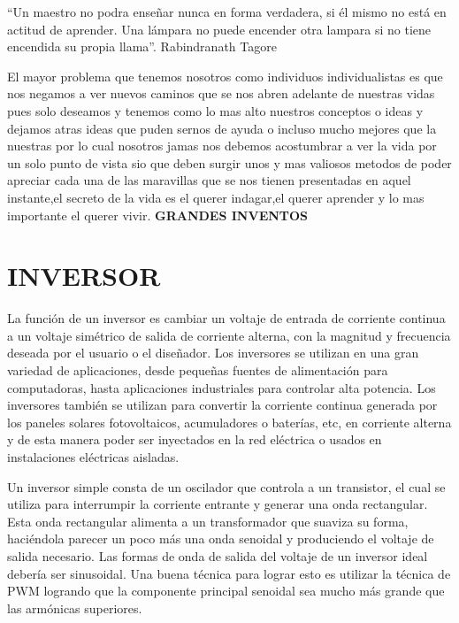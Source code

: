 \documentclass[12pt]{article}
\begin{document}
\vspace{15PT}
“Un maestro no podra enseñar nunca en forma verdadera, si él mismo no está en actitud de aprender. Una lámpara no puede encender otra lampara si no tiene encendida su propia llama”. Rabindranath Tagore

\vspace{15PT}
El mayor problema que tenemos nosotros como individuos individualistas es que nos negamos a ver nuevos caminos que se nos abren adelante de nuestras vidas pues solo deseamos y tenemos como lo mas alto nuestros conceptos o ideas y dejamos atras ideas que puden sernos de ayuda o incluso mucho mejores que la nuestras por lo cual nosotros jamas nos debemos acostumbrar a ver la vida por un solo punto de vista sio que deben surgir unos y mas valiosos metodos de poder apreciar cada una de las maravillas que se nos tienen presentadas en aquel instante,el secreto de la vida es el querer indagar,el querer aprender y lo mas importante el querer vivir.
\newpage
\bf{\sc\Huge GRANDES INVENTOS}
\section{INVERSOR}
\large
La función de un inversor es cambiar un voltaje de entrada de corriente continua a un voltaje simétrico de salida de corriente alterna, con la magnitud y frecuencia deseada por el usuario o el diseñador. Los inversores se utilizan en una gran variedad de aplicaciones, desde pequeñas fuentes de alimentación para computadoras, hasta aplicaciones industriales para controlar alta potencia. Los inversores también se utilizan para convertir la corriente continua generada por los paneles solares fotovoltaicos, acumuladores o baterías, etc, en corriente alterna y de esta manera poder ser inyectados en la red eléctrica o usados en instalaciones eléctricas aisladas.

\vspace{15PT}
Un inversor simple consta de un oscilador que controla a un transistor, el cual se utiliza para interrumpir la corriente entrante y generar una onda rectangular.
Esta onda rectangular alimenta a un transformador que suaviza su forma, haciéndola parecer un poco más una onda senoidal y produciendo el voltaje de salida necesario. Las formas de onda de salida del voltaje de un inversor ideal debería ser sinusoidal. Una buena técnica para lograr esto es utilizar la técnica de PWM logrando que la componente principal senoidal sea mucho más grande que las armónicas superiores.
\end{document}
